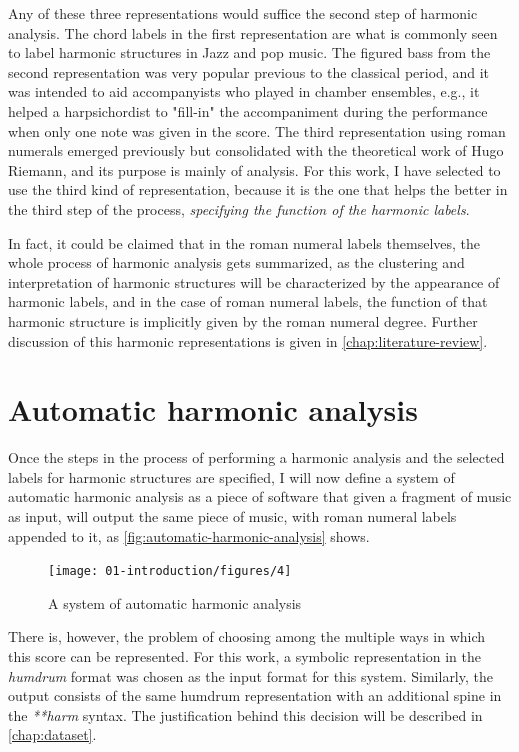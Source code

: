 Any of these three representations would suffice the second step of harmonic analysis. The chord labels in the first representation are what is commonly seen to label harmonic structures in Jazz and pop music. The figured bass from the second representation was very popular previous to the classical period, and it was intended to aid accompanyists who played in chamber ensembles, e.g., it helped a harpsichordist to "fill-in" the accompaniment during the performance when only one note was given in the score. The third representation using roman numerals emerged previously but consolidated with the theoretical work of Hugo Riemann, and its purpose is mainly of analysis. For this work, I have selected to use the third kind of representation, because it is the one that helps the better in the third step of the process, \emph{specifying the function of the harmonic labels}.

In fact, it could be claimed that in the roman numeral labels themselves, the whole process of harmonic analysis gets summarized, as the clustering and interpretation of harmonic structures will be characterized by the appearance of harmonic labels, and in the case of roman numeral labels, the function of that harmonic structure is implicitly given by the roman numeral degree. Further discussion of this harmonic representations is given in  \autoref{chap:literature-review}.

\section{Automatic harmonic analysis}
Once the steps in the process of performing a harmonic analysis and the selected labels for harmonic structures are specified, I will now define a system of automatic harmonic analysis as a piece of software that given a fragment of music as input, will output the same piece of music, with roman numeral labels appended to it, as \autoref{fig:automatic-harmonic-analysis} shows.

\begin{figure}[h]
  \centering
    \texttt{[image: 01-introduction/figures/4]}
  \caption{A system of automatic harmonic analysis}
  \label{fig:automatic-harmonic-analysis}
\end{figure}

There is, however, the problem of choosing among the multiple ways in which this score can be represented. For this work, a symbolic representation in the \emph{humdrum} \cite{humdrum} format was chosen as the input format for this system. Similarly, the output consists of the same humdrum representation with an additional spine in the \emph{**harm} \cite{harm} syntax. The justification behind this decision will be described in \autoref{chap:dataset}.

